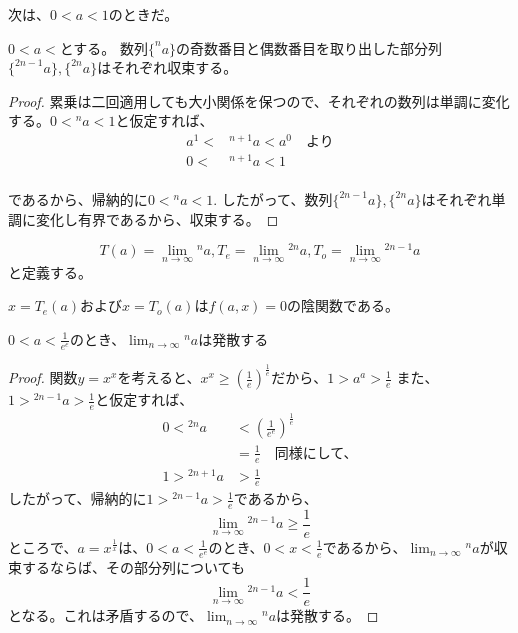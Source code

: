 	次は、$0 < a < 1$のときだ。
	\begin{lemma}
		$0 < a < $とする。
		数列$\{^n a\}$の奇数番目と偶数番目を取り出した部分列$\{^{2n-1} a\},\{^{2n} a\}$はそれぞれ収束する。
	\end{lemma}
	\begin{proof}
	
		累乗は二回適用しても大小関係を保つので、それぞれの数列は単調に変化する。$0 < {^n a} < 1$と仮定すれば、
		\begin{align*}
			a^1<&{^{n+1} a}<a^0 \quad \text{より}\\
			0<&{^{n+1} a}<1 \\
		\end{align*}
		
		であるから、帰納的に$0 < {^n a} < 1$.
		したがって、数列$\{^{2n-1} a\},\{^{2n} a\}$はそれぞれ単調に変化し有界であるから、収束する。
	\end{proof}

	\[
		T(a) = \lim_{n \to \infty} {^n a},
		T_e = \lim_{n \to \infty} {^{2n} a},
		T_o = \lim_{n \to \infty} {^{2n - 1} a}
	\]と定義する。
	\begin{theorem}
	\label{th:tetration_implicit_function}
		$x = T_e(a)$および$x = T_o(a)$は$f(a,x)=0$の陰関数である。
	\end{theorem}
	
	\begin{theorem}
		$0 < a < \frac{1}{e^e}$のとき、$\displaystyle \lim_{n \to \infty} {^n a}$は発散する
	\end{theorem}
	\begin{proof}
		
		関数$y = x^x$を考えると、$x^x \geq (\frac{1}{e})^{\frac{1}{e}}$だから、$1 > a^a > \frac{1}{e}$
		また、$1 > {^{2n-1} a} > \frac{1}{e}$と仮定すれば、
		\begin{align*}
			0 < {^{2n} a} &< (\frac{1}{e^e})^{\frac{1}{e}} \\
						  &= \frac{1}{e} \quad \text{同様にして、} \\
			1 > {^{2n+1} a} &> \frac{1}{e}
		\end{align*}
		したがって、帰納的に$1 > {^{2n-1} a} > \frac{1}{e}$であるから、
		\begin{equation*}
			\lim_{n \to \infty} {^{2n - 1} a} \geq \frac{1}{e}
		\end{equation*}
		ところで、$a = x^{\frac{1}{x}}$は、$0 < a < \frac{1}{e^e}$のとき、$0 < x < \frac{1}{e}$であるから、$\displaystyle \lim_{n \to \infty} {^n a}$が収束するならば、その部分列についても
		\begin{equation*}
			\lim_{n \to \infty} {^{2n - 1} a} < \frac{1}{e}
		\end{equation*}
		となる。これは矛盾するので、$\lim_{n \to \infty} {^n a}$は発散する。
	\end{proof}
	
